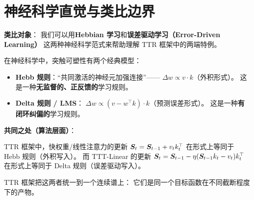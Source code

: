 \section{神经科学直觉与类比边界}
\label{sec:ttr_neuro}

\begin{neurosciencebox}[title=神经科学直觉：Hebbian 学习与误差驱动学习的统一]

\textbf{类比对象}：
我们可以用\textbf{Hebbian 学习}和\textbf{误差驱动学习（Error-Driven Learning）}
这两种神经科学范式来帮助理解 TTR 框架中的两端特例。

在神经科学中，突触可塑性有两个经典模型：
\begin{itemize}
  \item \textbf{Hebb 规则}：``共同激活的神经元加强连接''——
    $\Delta w \propto v \cdot k$（外积形式）。
    这是一种\textbf{无监督的、正反馈的}学习规则。

  \item \textbf{Delta 规则 / LMS}：
    $\Delta w \propto (v - w^\top k) \cdot k$（预测误差形式）。
    这是一种\textbf{有闭环纠偏的}学习规则。
\end{itemize}

\textbf{共同之处（算法层面）}：

TTR 框架中，快权重/线性注意力的更新
$\boldsymbol{S}_t = \boldsymbol{S}_{t-1} + v_t k_t^\top$
在形式上等同于 Hebb 规则（外积写入）。
而 TTT-Linear 的更新
$\boldsymbol{S}_t = \boldsymbol{S}_{t-1} - \eta(\boldsymbol{S}_{t-1} k_t - v_t) k_t^\top$
在形式上等同于 Delta 规则（误差驱动写入）。

TTR 框架把这两者统一到一个连续谱上：
它们是同一个目标函数在不同截断程度下的产物。

\end{neurosciencebox}

